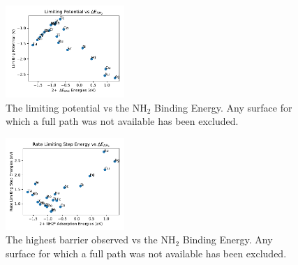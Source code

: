

\begin{figure}
    \centering
    \includegraphics[width=0.4\textwidth]{Images/NH2_v_limiting_pot.pdf}
    
    \caption{The limiting potential vs the NH$_2$ Binding Energy. Any surface for which a full path was not available has been excluded.}
    \label{fig:NH2_limiting_pot}
\end{figure}


\begin{figure}
    \centering
    \includegraphics[width=0.4\textwidth]{Images/NH2_v_rate_limiting.pdf}
    
    \caption{The highest barrier observed vs the NH$_2$ Binding Energy. Any surface for which a full path was not available has been excluded.}
    \label{fig:NH2_limiting_bar}
\end{figure}

